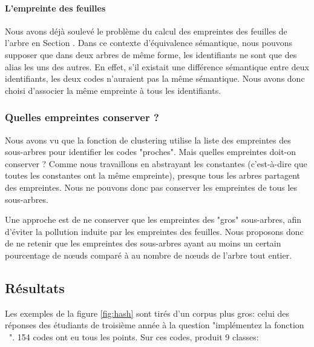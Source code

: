 \paragraph{L'empreinte des feuilles}
Nous avons déjà soulevé le problème du calcul des empreintes des feuilles de l'arbre en Section . Dans ce contexte d'équivalence sémantique, nous pouvons supposer que dans deux arbres de même forme, les identifiants ne sont que des alias les uns des autres. En effet, s'il existait une différence sémantique entre deux identifiants, les deux codes n'auraient pas la même sémantique.
Nous avons donc choisi d'associer la même empreinte à tous les identifiants.

\subsubsection{Quelles empreintes conserver ?}

Nous avons vu que la fonction de clustering utilise la liste des empreintes des sous-arbres pour identifier les codes "proches". Mais quelles empreintes doit-on conserver ? Comme nous travaillons en abstrayant les constantes (c'est-à-dire que toutes les constantes ont la même empreinte), presque tous les arbres partagent des empreintes. Nous ne pouvons donc pas conserver les empreintes de tous les sous-arbres.

Une approche est de ne conserver que les empreintes des "gros" sous-arbres, afin d'éviter la pollution induite par les empreintes des feuilles. Nous proposons donc de ne retenir que les empreintes des sous-arbres ayant au moins un certain pourcentage de nœuds comparé à au nombre de nœuds de l'arbre tout entier.

\subsection{Résultats}

Les exemples de la figure \ref{fig:hash} sont tirés d'un corpus plus gros: celui des réponses des étudiants de troisième année à la question "implémentez la fonction ~". 154 codes ont eu tous les points. Sur ces codes, {\Asak} produit 9 classes:

